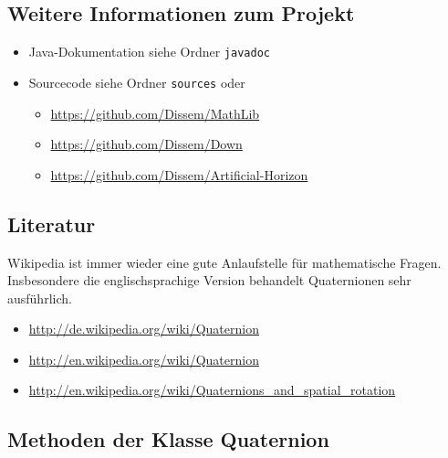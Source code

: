 \documentclass[12pt]{article}
\begin{document}
  \subsection{Weitere Informationen zum Projekt}

  \begin{itemize}
    \item Java-Dokumentation siehe Ordner \texttt{javadoc}
    \item Sourcecode siehe Ordner \texttt{sources} oder
    \begin{itemize}
      \item \url{https://github.com/Dissem/MathLib}
      \item \url{https://github.com/Dissem/Down}
      \item \url{https://github.com/Dissem/Artificial-Horizon}
    \end{itemize}
  \end{itemize}


  \subsection{Literatur}

  Wikipedia ist immer wieder eine gute Anlaufstelle für mathematische Fragen. Insbesondere die englischsprachige Version behandelt Quaternionen sehr ausführlich.

  \begin{itemize}
    \item \url{http://de.wikipedia.org/wiki/Quaternion}
    \item \url{http://en.wikipedia.org/wiki/Quaternion}
    \item \url{http://en.wikipedia.org/wiki/Quaternions_and_spatial_rotation}
  \end{itemize}


  \subsection{Methoden der Klasse Quaternion}\label{methods}
\end{document}
